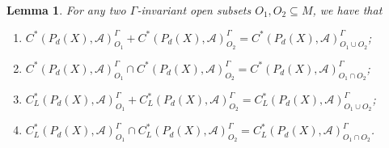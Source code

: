 \documentclass[pdflatex]{sn-jnl}
\theoremstyle{plain}
\newtheorem{lemma}[theorem]{Lemma}
\theoremstyle{definition}
\begin{document}
\begin{lemma}\label{lem:mv-ideals}
For any two $\Gamma$-invariant open subsets $O_1, O_2 \subseteq M$, we have that
\begin{enumerate}
\item[(1)] $C^{*}(P_{d}(X),\mathcal{A})^{\Gamma}_{O_{1}}+C^{*}(P_{d}(X),\mathcal{A})^{\Gamma}_{O_{2}}=C^{*}(P_{d}(X),\mathcal{A})^{\Gamma}_{O_{1}\cup O_{2}}$;
\item[(2)] $C^{*}(P_{d}(X),\mathcal{A})^{\Gamma}_{O_{1}}\cap C^{*}(P_{d}(X),\mathcal{A})^{\Gamma}_{O_{2}}=C^{*}(P_{d}(X),\mathcal{A})^{\Gamma}_{O_{1}\cap O_{2}}$;
\item[(3)] $C^{*}_{L}(P_{d}(X),\mathcal{A})^{\Gamma}_{O_{1}}+C^{*}_{L}(P_{d}(X),\mathcal{A})^{\Gamma}_{O_{2}}=C^{*}_{L}(P_{d}(X),\mathcal{A})^{\Gamma}_{O_{1}\cup O_{2}}$;
\item[(4)] $C^{*}_{L}(P_{d}(X),\mathcal{A})^{\Gamma}_{O_{1}}\cap C^{*}_{L}(P_{d}(X),\mathcal{A})^{\Gamma}_{O_{2}}=C^{*}_{L}(P_{d}(X),\mathcal{A})^{\Gamma}_{O_{1}\cap O_{2}}$.
\end{enumerate}
\end{lemma}
\end{document}
